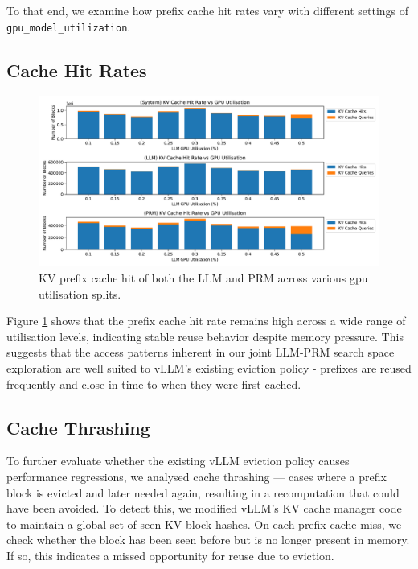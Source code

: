 \documentclass[11pt,twoside]{report}
\begin{document}
To that end, we examine how prefix cache hit rates vary with different settings of \texttt{gpu\_model\_utilization}.

\subsection{Cache Hit Rates}
\begin{figure}[htbp]
\centering
\includegraphics[width=\textwidth]{figures/kv_cache_hit_rate.pdf}
\caption{KV prefix cache hit of both the LLM and PRM across various gpu utilisation splits.}
\label{fig:kv_cache_hit_rate}
\end{figure}

Figure \ref{fig:kv_cache_hit_rate} shows that the prefix cache hit rate remains high across a wide range of utilisation levels, indicating stable reuse behavior despite memory pressure. 
This suggests that the access patterns inherent in our joint LLM-PRM search space exploration are well suited to vLLM's existing eviction policy - prefixes are reused frequently and close in time to when they were first cached.

\subsection{Cache Thrashing}
To further evaluate whether the existing vLLM eviction policy causes performance regressions, we analysed cache thrashing — cases where a prefix block is evicted and later needed again, resulting in a recomputation that could have been avoided. 
To detect this, we modified vLLM's KV cache manager code to maintain a global set of seen KV block hashes. 
On each prefix cache miss, we check whether the block has been seen before but is no longer present in memory. 
If so, this indicates a missed opportunity for reuse due to eviction.
\end{document}
